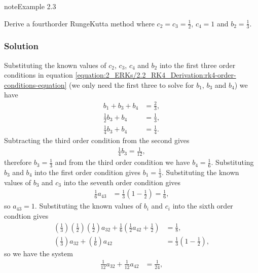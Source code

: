 \documentclass[letterpaper,10pt,english]{jupyterBook}
\begin{document}
\label{\detokenize{2_ERKs/2.2_RK4_Derivation:rk4-derivation-example}}
\begin{sphinxadmonition}{note}{Example 2.3}

\sphinxAtStartPar
Derive a fourth\sphinxhyphen{}order Runge\sphinxhyphen{}Kutta method where \(c_2 = c_3 = \frac{1}{2}\), \(c_4 =1\) and \(b_2 = \frac{1}{3}\).
\subsubsection*{Solution}

\sphinxAtStartPar
Substituting the known values of \(c_2\), \(c_3\), \(c_4\) and \(b_2\) into the first three order conditions in equation \eqref{equation:2_ERKs/2.2_RK4_Derivation:rk4-order-conditions-equation} (we only need the first three to solve for \(b_1\), \(b_3\) and \(b_4\)) we have
\begin{align*}
    b_1 + b_3 + b_4 &= \frac{2}{3}, \\
    \frac{1}{2}b_3 + b_4 &= \frac{1}{3}, \\
    \frac{1}{4}b_3 + b_4 &= \frac{1}{4}.
\end{align*}
\sphinxAtStartPar
Subtracting the third order condition from the second gives
\begin{align*}
    \frac{1}{4}b_3 = \frac{1}{12},
\end{align*}
\sphinxAtStartPar
therefore \(b_3 = \frac{1}{3}\) and from the third order condition we have \(b_4 = \frac{1}{6}\). Substituting \(b_3\) and \(b_4\) into the first order condition gives \(b_1 = \frac{1}{3}\). Substituting the known values of \(b_3\) and \(c_3\) into the seventh order condition gives
\begin{align*}
    \frac{1}{6}a_{43} &= \frac{1}{3}\left(1 - \frac{1}{2}\right) = \frac{1}{6},
\end{align*}
\sphinxAtStartPar
so \(a_{43} = 1\). Substituting the known values of \(b_i\) and \(c_i\) into the sixth order condtion gives
\begin{align*}
    \left( \frac{1}{3} \right) \left( \frac{1}{2} \right) \left( \frac{1}{2} \right) a_{32} + \frac{1}{6} \left( \frac{1}{2} a_{42} + \frac{1}{2} \right) &= \frac{1}{8}, \\
    \left( \frac{1}{3} \right) a_{32} + \left( \frac{1}{6} \right) a_{42} &= \frac{1}{3} \left( 1 - \frac{1}{2} \right),
\end{align*}
\sphinxAtStartPar
so we have the system
\begin{align*}
    \frac{1}{12}a_{32} + \frac{1}{12}a_{42} &= \frac{1}{24}, \\

\end{align*}
\end{sphinxadmonition}
\end{document}
